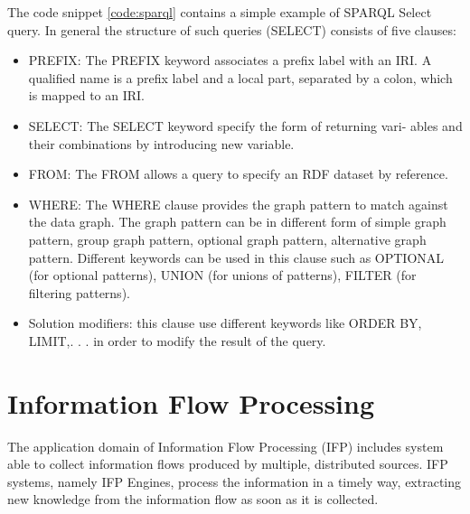 The code snippet \ref{code:sparql} contains a simple example of SPARQL Select query. In general the structure of such queries (SELECT) consists of five clauses:
\begin{itemize}
\item PREFIX: The PREFIX keyword associates a prefix label with an IRI. A qualified name is a prefix label and a local part, separated by a colon, which is mapped to an IRI.
\item SELECT: The SELECT keyword specify the form of returning vari- ables and their combinations by introducing new variable.
\item FROM: The FROM allows a query to specify an RDF dataset by reference.
\item WHERE: The WHERE clause provides the graph pattern to match against the data graph. The graph pattern can be in different form of simple graph pattern, group graph pattern, optional graph pattern, alternative graph pattern. Different keywords can be used in this clause such as OPTIONAL (for optional patterns), UNION (for unions of patterns), FILTER (for filtering patterns).
\item Solution modifiers: this clause use different keywords like ORDER BY, LIMIT,. . . in order to modify the result of the query.
\end{itemize}


\section{Information Flow Processing}\label{sec:ifp}

The application domain of Information Flow Processing (IFP) includes system able to collect information flows produced by multiple, distributed sources. IFP systems, namely IFP Engines, process the information in a timely way, extracting new knowledge from the information flow as soon as it is collected.


